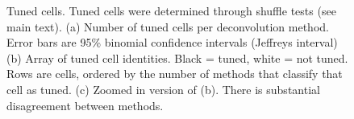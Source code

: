\documentclass[a4paper]{article}
\begin{document}
\begin{figure}
\centering
{}
\caption{\label{fig:tuned_cells} Tuned cells. Tuned cells were determined through shuffle tests (see main text).  (a) Number of tuned cells per deconvolution method. Error bars are 95\% binomial confidence intervals (Jeffreys interval) (b) Array of tuned cell identities. Black = tuned, white = not tuned. Rows are cells, ordered by the number of methods that classify that cell as tuned. (c) Zoomed in version of (b). There is substantial disagreement between methods.}
\end{figure}
\end{document}
